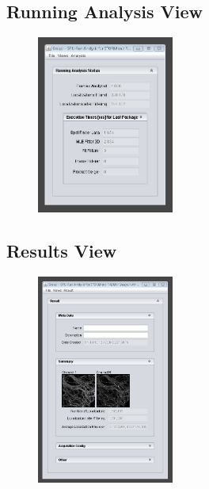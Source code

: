 \documentclass[aspectratio=169]{beamer}
\begin{document}
\subsection{Running Analysis View}

\begin{frame}
 
 \begin{figure}[h!]
    \centering	\includegraphics[width=0.4\textwidth]{./images/graspj_running1.png} 
    \caption{}
    \label{fig:running}
    \end{figure} 
 
\end{frame}

\subsection{Results View}
\begin{frame}
 
 \begin{figure}[h!]
    \centering	\includegraphics[width=0.4\textwidth]{./images/graspj_results1.png} 
    \caption{}
    \label{fig:results1}
    \end{figure} 
 
\end{frame}
\end{document}
